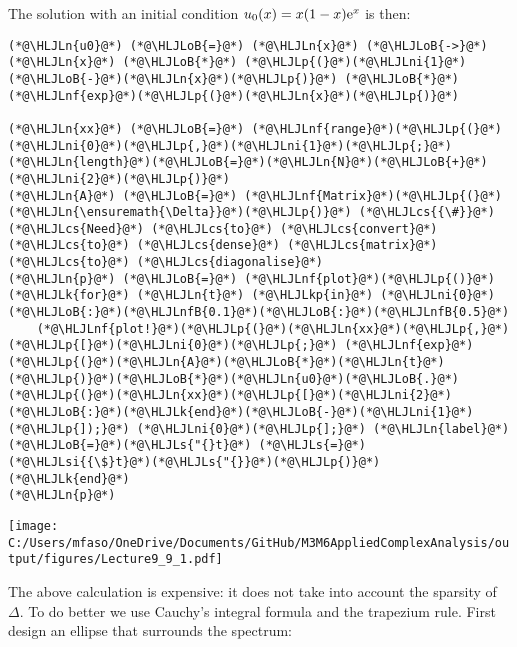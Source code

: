 \documentclass[12pt,a4paper]{article}
\newcommand{\HLJLk}[1]{\textcolor[RGB]{148,91,176}{\textbf{#1}}}
\newcommand{\HLJLkp}[1]{\textcolor[RGB]{148,91,176}{\textbf{#1}}}
\newcommand{\HLJLn}[1]{#1}
\newcommand{\HLJLnf}[1]{\textcolor[RGB]{66,102,213}{#1}}
\newcommand{\HLJLs}[1]{\textcolor[RGB]{201,61,57}{#1}}
\newcommand{\HLJLsi}[1]{#1}
\newcommand{\HLJLnfB}[1]{\textcolor[RGB]{59,151,46}{#1}}
\newcommand{\HLJLni}[1]{\textcolor[RGB]{59,151,46}{#1}}
\newcommand{\HLJLoB}[1]{\textcolor[RGB]{102,102,102}{\textbf{#1}}}
\newcommand{\HLJLp}[1]{#1}
\newcommand{\HLJLcs}[1]{\textcolor[RGB]{153,153,119}{\textit{#1}}}
\def\E{ {\rm e} }
\begin{document}
The solution with an initial condition $u_0(x) = x (1-x) \E^x$ is then:


\begin{lstlisting}
(*@\HLJLn{u0}@*) (*@\HLJLoB{=}@*) (*@\HLJLn{x}@*) (*@\HLJLoB{->}@*) (*@\HLJLn{x}@*) (*@\HLJLoB{*}@*) (*@\HLJLp{(}@*)(*@\HLJLni{1}@*)(*@\HLJLoB{-}@*)(*@\HLJLn{x}@*)(*@\HLJLp{)}@*) (*@\HLJLoB{*}@*) (*@\HLJLnf{exp}@*)(*@\HLJLp{(}@*)(*@\HLJLn{x}@*)(*@\HLJLp{)}@*)

(*@\HLJLn{xx}@*) (*@\HLJLoB{=}@*) (*@\HLJLnf{range}@*)(*@\HLJLp{(}@*)(*@\HLJLni{0}@*)(*@\HLJLp{,}@*)(*@\HLJLni{1}@*)(*@\HLJLp{;}@*) (*@\HLJLn{length}@*)(*@\HLJLoB{=}@*)(*@\HLJLn{N}@*)(*@\HLJLoB{+}@*)(*@\HLJLni{2}@*)(*@\HLJLp{)}@*)
(*@\HLJLn{A}@*) (*@\HLJLoB{=}@*) (*@\HLJLnf{Matrix}@*)(*@\HLJLp{(}@*)(*@\HLJLn{\ensuremath{\Delta}}@*)(*@\HLJLp{)}@*) (*@\HLJLcs{{\#}}@*) (*@\HLJLcs{Need}@*) (*@\HLJLcs{to}@*) (*@\HLJLcs{convert}@*) (*@\HLJLcs{to}@*) (*@\HLJLcs{dense}@*) (*@\HLJLcs{matrix}@*) (*@\HLJLcs{to}@*) (*@\HLJLcs{diagonalise}@*)
(*@\HLJLn{p}@*) (*@\HLJLoB{=}@*) (*@\HLJLnf{plot}@*)(*@\HLJLp{()}@*)
(*@\HLJLk{for}@*) (*@\HLJLn{t}@*) (*@\HLJLkp{in}@*) (*@\HLJLni{0}@*)(*@\HLJLoB{:}@*)(*@\HLJLnfB{0.1}@*)(*@\HLJLoB{:}@*)(*@\HLJLnfB{0.5}@*)
    (*@\HLJLnf{plot!}@*)(*@\HLJLp{(}@*)(*@\HLJLn{xx}@*)(*@\HLJLp{,}@*) (*@\HLJLp{[}@*)(*@\HLJLni{0}@*)(*@\HLJLp{;}@*) (*@\HLJLnf{exp}@*)(*@\HLJLp{(}@*)(*@\HLJLn{A}@*)(*@\HLJLoB{*}@*)(*@\HLJLn{t}@*)(*@\HLJLp{)}@*)(*@\HLJLoB{*}@*)(*@\HLJLn{u0}@*)(*@\HLJLoB{.}@*)(*@\HLJLp{(}@*)(*@\HLJLn{xx}@*)(*@\HLJLp{[}@*)(*@\HLJLni{2}@*)(*@\HLJLoB{:}@*)(*@\HLJLk{end}@*)(*@\HLJLoB{-}@*)(*@\HLJLni{1}@*)(*@\HLJLp{]);}@*) (*@\HLJLni{0}@*)(*@\HLJLp{];}@*) (*@\HLJLn{label}@*)(*@\HLJLoB{=}@*)(*@\HLJLs{"{}t}@*) (*@\HLJLs{=}@*) (*@\HLJLsi{{\$}t}@*)(*@\HLJLs{"{}}@*)(*@\HLJLp{)}@*)
(*@\HLJLk{end}@*)
(*@\HLJLn{p}@*)
\end{lstlisting}

\texttt{[image: C:/Users/mfaso/OneDrive/Documents/GitHub/M3M6AppliedComplexAnalysis/output/figures/Lecture9\_9\_1.pdf]}

The above calculation is expensive: it does not take into account the sparsity of \texttt{\ensuremath{\Delta}}. To do better we use Cauchy's integral formula and the trapezium rule. First design an ellipse that surrounds the spectrum:
\end{document}
